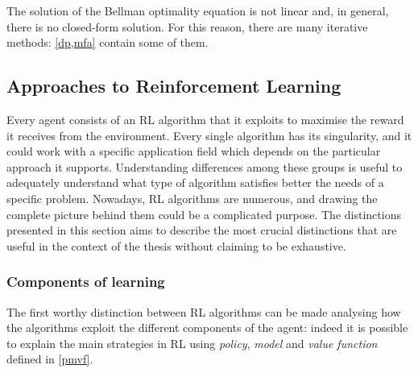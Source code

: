 The solution of the Bellman optimality equation is not linear and, in general, there is no closed-form solution. For this reason, there are many iterative methods: \vref{dp,mfa} contain some of them.


\subsection{Approaches to Reinforcement Learning} \label{approaches}

Every agent consists of an RL algorithm that it exploits to maximise the reward it receives from the environment. Every single algorithm has its singularity, and it could work with a specific application field which depends on the particular approach it supports. Understanding differences among these groups is useful to adequately understand what type of algorithm satisfies better the needs of a specific problem. Nowadays, RL algorithms are numerous, and drawing the complete picture behind them could be a complicated purpose. The distinctions presented in this section aims to describe the most crucial distinctions that are useful in the context of the thesis without claiming to be exhaustive.

\subsubsection{Components of learning}

The first worthy distinction between RL algorithms can be made analysing how the algorithms exploit the different components of the agent: indeed it is possible to explain the main strategies in RL using \textit{policy}, \textit{model} and \textit{value function} defined in \vref{pmvf}.


